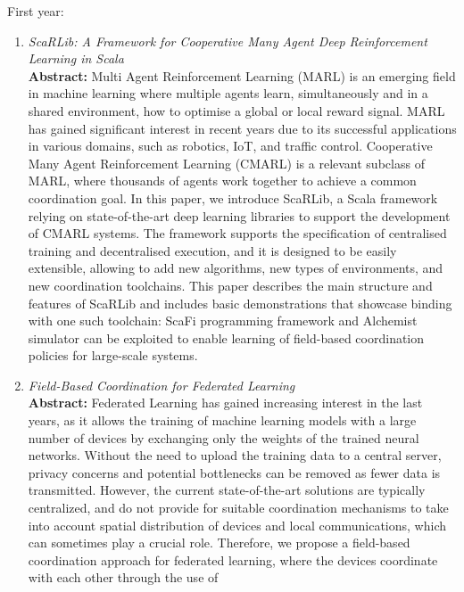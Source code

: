 \documentclass[runningheads]{llncs}
\begin{document}
\noindent
First year:
\begin{enumerate}
    \item \emph{ScaRLib: A Framework for Cooperative Many Agent Deep Reinforcement Learning in Scala}~\cite{DBLP:conf/coordination/DominiCAV23} \\
    \textbf{Abstract: }
    Multi Agent Reinforcement Learning (MARL) is an emerging field in machine learning where multiple agents learn, simultaneously and in a shared environment, 
     how to optimise a global or local reward signal. MARL has gained significant interest in recent years due to its successful applications in various domains,
     such as robotics, IoT, and traffic control. Cooperative Many Agent Reinforcement Learning (CMARL) is a relevant subclass of MARL, where thousands of 
     agents work together to achieve a common coordination goal.
    In this paper, we introduce ScaRLib, a Scala framework relying on state-of-the-art deep learning libraries to support the development of CMARL systems. 
    The framework supports the specification of centralised training and decentralised execution, and it is designed to be easily extensible, allowing to add new 
     algorithms, new types of environments, and new coordination toolchains.
    This paper describes the main structure and features of ScaRLib and includes basic demonstrations that showcase binding with one such toolchain: 
     ScaFi programming framework and Alchemist simulator can be exploited to enable learning of field-based coordination policies for large-scale systems.
    \item \emph{Field-Based Coordination for Federated Learning}~\cite{DBLP:conf/coordination/DominiAEV24} \\
    \textbf{Abstract: }
    Federated Learning has gained increasing interest in the last years, as it allows the training of machine learning models with a large number of devices 
     by exchanging only the weights of the trained neural networks. 
    Without the need to upload the training data to a central server, privacy concerns and potential bottlenecks can be removed as fewer data is transmitted. 
    However, the current state-of-the-art solutions are typically centralized, and do not provide for suitable coordination mechanisms to take into account 
     spatial distribution of devices and local communications, which can sometimes play a crucial role. 
    Therefore, we propose a field-based coordination approach for federated learning, where the devices coordinate with each other through the use of 

\end{enumerate}
\end{document}
